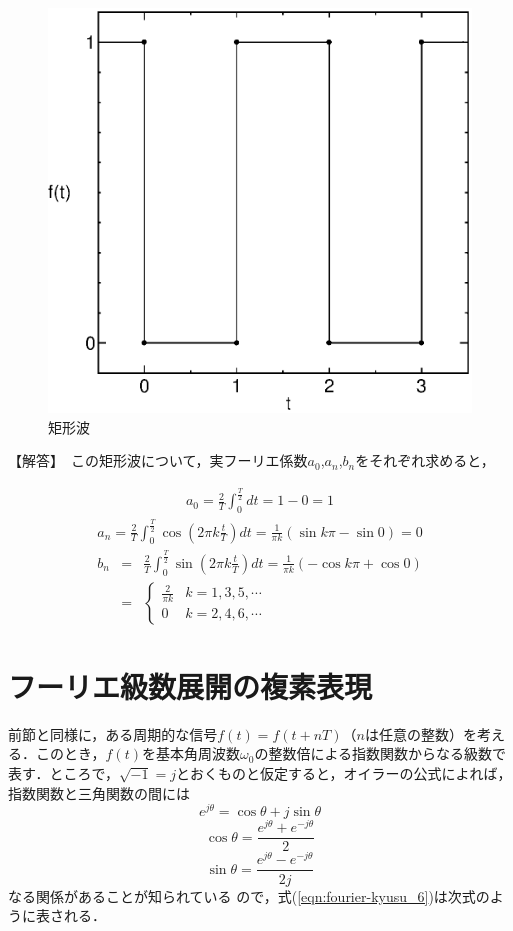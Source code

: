 \begin{figure}[H]
\begin{center}
\includegraphics[width=.35\textwidth]{fig/kukeiha.eps}
\caption{矩形波}
\label{fig:kukeiha_61}
\end{center}
\end{figure}

【解答】　この矩形波について，実フーリエ係数$a_0$,$a_n$,$b_n$をそれぞれ求めると，

\begin{eqnarray}
a_0  =  \frac{2}{T}\int^{\frac{T}{2}}_{0} dt%
  =  1 - 0  %
  =  1
\end{eqnarray}
\begin{eqnarray}
a_n  =  \frac{2}{T}\int^{\frac{T}{2}}_{0}\cos \left( 2\pi k \frac{t}{T} \right) dt%
  =  \frac{1}{\pi k} (\sin k\pi - \sin 0 ) %
  =  0
\end{eqnarray}
\begin{eqnarray}
b_n  &=&  \frac{2}{T}\int^{\frac{T}{2}}_{0}\sin \left( 2\pi k \frac{t}{T} \right) dt%
  =  \frac{1}{\pi k} ( - \cos k\pi + \cos 0) \nonumber \\
  &=&  \left \{
\begin{array}{cc}
\displaystyle \frac{2}{\pi k} & k=1,3,5,\cdots \\
0 & k=2,4,6,\cdots
\end{array}
\right .
\end{eqnarray}

\section{フーリエ級数展開の複素表現}

前節と同様に，ある周期的な信号$f(t)=f(t+nT)$（$n$は任意の整数）を考える．このとき，$f(t)$を基本角周波数$\omega_0$の整数倍による指数関数からなる級数で表す．ところで，$\sqrt{-1}=j$とおくものと仮定すると，オイラーの公式によれば，指数関数と三角関数の間には
\begin{equation}
e^{j\theta}=\cos \theta + j \sin \theta
\end{equation}
\begin{equation}
\cos \theta=\frac{e^{j\theta}+e^{-j\theta}}{2}
\end{equation}
\begin{equation}
\sin \theta=\frac{e^{j\theta}-e^{-j\theta}}{2j}
\end{equation}
なる関係があることが知られている%
ので，式(\ref{eqn:fourier-kyusu_6})は次式のように表される．


